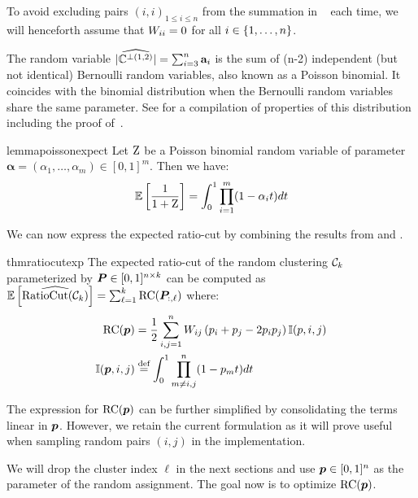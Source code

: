 To avoid excluding pairs $(i,i)_{1\leq i \leq n }$ from the summation in
~ each time, we will henceforth assume that ${W}_{ii} = 0$
for all $i \in \left\lbrace1,\ldots,n\right\rbrace$.

The random variable $\widehat{|{\mathbb{C}}^{\perp(1,2)}|} = \sum_{i=3}^n {\mathbf{a}}_i$ is the sum
of (n-2) independent (but not identical) Bernoulli random variables, also known as
a Poisson binomial. It coincides with the binomial distribution when the Bernoulli
random variables share the same parameter. See  for a
compilation of properties of this distribution including the proof
of~.

\begin{restatable}{lemma}{poissonexpect}
	\label{lemma:poissonexpect}
	Let ${\textnormal{Z}}$ be a Poisson binomial random variable of parameter
	$\bm{\alpha}=(\alpha_1,\ldots,\alpha_m)\in[0,1]^m$. Then we have:
	\[
		\mathbb{E}\left[{\frac{1}{1 + {\textnormal{Z}}}}\right]  = \int_{0}^{1} \prod_{i=1}^{m} (1-\alpha_i t)dt
	\]
\end{restatable}

We can now express the expected ratio-cut by combining the results from
 and .

\begin{restatable}{thm}{ratiocutexp}
	\label{thm:ratiocutexp}
	The expected ratio-cut of the random clustering ${\mathcal{C}}_k$ parameterized by
	${\bm{P}}\in[0,1]^{n\times k}$ can be computed as $\mathbb{E}\left[ \widehat{\operatorname*{RatioCut}({\mathcal{C}}_k)} \right] =
		\sum_{\ell=1}^k \operatorname*{RC}({\bm{P}}_{:,\ell}) $ where:
	\begin{align*}
		\operatorname*{RC}({\bm{p}})       & = {\frac{1}{2}} \sum_{i,j=1}^n {W}_{ij}\left({p}_i + {p}_j -2{p}_i{p}_j\right) {\mathbb{I}}({p}, i, j) \\
		{\mathbb{I}}({\bm{p}}, i, j) & \stackrel{\text{def}}{=} \int_{0}^{1} \prod_{m\neq i,j}^{n} (1-{p}_m t)dt
	\end{align*}
\end{restatable}
The expression for $\operatorname*{RC}({\bm{p}})$ can be further simplified by consolidating the terms linear in ${\bm{p}}$. However, we retain the current formulation as it will prove useful when sampling random pairs $(i, j)$ in the implementation.

We will drop the cluster index $\ell$ in the next sections and use ${\bm{p}} \in
[0,1]^n$ as the parameter of the random assignment. The goal now is to optimize
$\operatorname*{RC}({\bm{p}})$.

